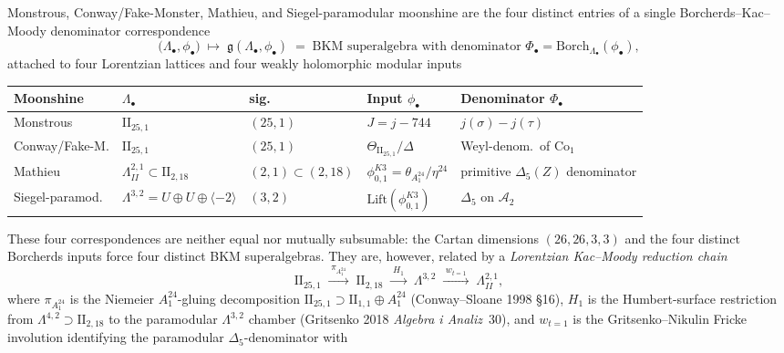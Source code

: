 \begin{theorem}
\label{thm:k3ca-four-moonshines-four-lattices}
Monstrous, Conway/Fake-Monster, Mathieu, and Siegel-paramodular
moonshine are the four distinct entries of a single
Borcherds--Kac--Moody denominator correspondence
\[
 \bigl(\Lambda_\bullet,\phi_\bullet\bigr)\;\longmapsto\;
 \mathfrak g(\Lambda_\bullet,\phi_\bullet)
 \;=\;\text{BKM superalgebra with denominator }
 \Phi_\bullet=\mathrm{Borch}_{\Lambda_\bullet}(\phi_\bullet),
\]
attached to four Lorentzian lattices and four weakly holomorphic
modular inputs
\begin{center}
\renewcommand{\arraystretch}{1.15}
\begin{tabular}{lllll}
\toprule
Moonshine & $\Lambda_\bullet$ & sig. & Input $\phi_\bullet$ & Denominator $\Phi_\bullet$ \\
\midrule
Monstrous & $\mathrm{II}_{25,1}$ & $(25,1)$ & $J=j-744$ & $j(\sigma)-j(\tau)$ \\
Conway/Fake-M. & $\mathrm{II}_{25,1}$ & $(25,1)$ & $\Theta_{\mathrm{II}_{25,1}}/\Delta$ & Weyl-denom.\ of $\mathrm{Co}_1$ \\
Mathieu & $\Lambda^{2,1}_{II}\subset\mathrm{II}_{2,18}$ & $(2,1)\subset(2,18)$ & $\phi^{K3}_{0,1}=\theta_{A_1^{24}}/\eta^{24}$ & primitive $\Delta_5(Z)$ denominator \\
Siegel-paramod. & $\Lambda^{3,2}=U\!\oplus\!U\!\oplus\!\langle{-2}\rangle$ & $(3,2)$ & $\mathrm{Lift}(\phi^{K3}_{0,1})$ & $\Delta_5$ on $\mathcal A_2$ \\
\bottomrule
\end{tabular}
\end{center}
These four correspondences are neither equal nor mutually
subsumable: the Cartan dimensions $(26,26,3,3)$ and the four
distinct Borcherds inputs force four distinct BKM superalgebras.
They are, however, related by a \emph{Lorentzian Kac--Moody
reduction chain}
\[
 \mathrm{II}_{25,1}
 \;\xrightarrow{\;\pi_{A_1^{24}}\;}\;
 \mathrm{II}_{2,18}
 \;\xrightarrow{\;H_1\;}\;
 \Lambda^{3,2}
 \;\xrightarrow{\;w_{t=1}\;}\;
 \Lambda^{2,1}_{II},
\]
where $\pi_{A_1^{24}}$ is the Niemeier $A_1^{24}$-gluing decomposition
$\mathrm{II}_{25,1}\supset\mathrm{II}_{1,1}\oplus A_1^{24}$
(Conway--Sloane 1998 \S16), $H_1$ is the Humbert-surface restriction
from $\Lambda^{4,2}\supset\mathrm{II}_{2,18}$ to the paramodular
$\Lambda^{3,2}$ chamber (Gritsenko 2018 \emph{Algebra i
Analiz}~30), and $w_{t=1}$ is the Gritsenko--Nikulin Fricke
involution identifying the paramodular $\Delta_5$-denominator with

\end{theorem}
